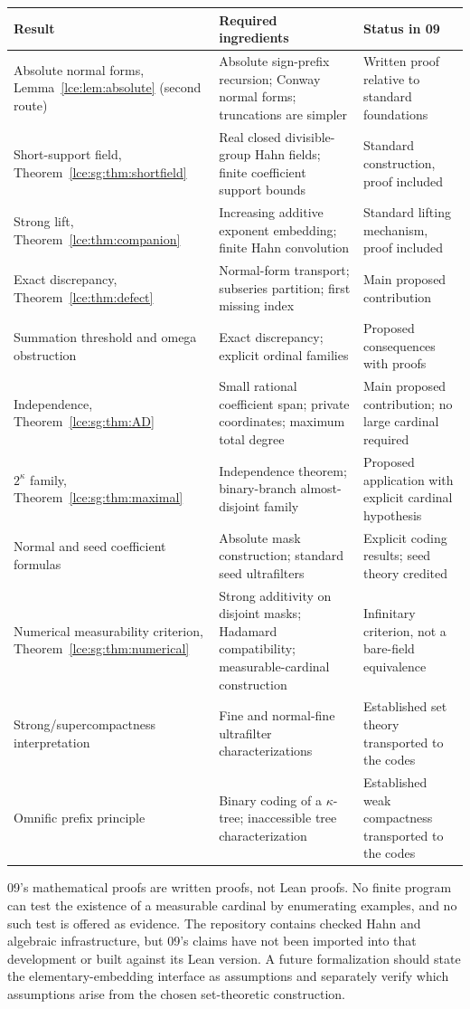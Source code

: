 \documentclass[11pt,letterpaper]{article}
\numberwithin{equation}{section}
\theoremstyle{definition}
\theoremstyle{remark}
\newcommand{\thref}[1]{Theorem~\ref{#1}}
\newcommand{\leref}[1]{Lemma~\ref{#1}}
\begin{document}
\begin{center}\small
\begin{longtable}{@{}P{0.29\textwidth}P{0.39\textwidth}P{0.24\textwidth}@{}}
\toprule
Result & Required ingredients & Status in 09\\
\midrule\endhead
Absolute normal forms, \leref{lce:lem:absolute} (second route) & Absolute
sign-prefix recursion; Conway normal forms; truncations are simpler &
Written proof relative to standard foundations\\[4pt]
Short-support field, \thref{lce:sg:thm:shortfield} & Real closed
divisible-group Hahn fields; finite coefficient support bounds & Standard
construction, proof included\\[4pt]
Strong lift, \thref{lce:thm:companion} & Increasing additive exponent
embedding; finite Hahn convolution & Standard lifting mechanism, proof
included\\[4pt]
Exact discrepancy, \thref{lce:thm:defect} & Normal-form transport; subseries
partition; first missing index & Main proposed contribution\\[4pt]
Summation threshold and omega obstruction & Exact discrepancy; explicit
ordinal families & Proposed consequences with proofs\\[4pt]
Independence, \thref{lce:sg:thm:AD} & Small rational coefficient span;
private coordinates; maximum total degree & Main proposed contribution; no
large cardinal required\\[4pt]
$2^\kappa$ family, \thref{lce:sg:thm:maximal} & Independence theorem;
binary-branch almost-disjoint family & Proposed application with explicit
cardinal hypothesis\\[4pt]
Normal and seed coefficient formulas & Absolute mask construction; standard
seed ultrafilters & Explicit coding results; seed theory credited\\[4pt]
Numerical measurability criterion, \thref{lce:sg:thm:numerical} & Strong
additivity on disjoint masks; Hadamard compatibility; measurable-cardinal
construction & Infinitary criterion, not a bare-field equivalence\\[4pt]
Strong/supercompactness interpretation & Fine and normal-fine ultrafilter
characterizations & Established set theory transported to the codes\\[4pt]
Omnific prefix principle & Binary coding of a $\kappa$-tree; inaccessible
tree characterization & Established weak compactness transported to the
codes\\
\bottomrule
\end{longtable}
\end{center}
09's mathematical proofs are written proofs, not Lean proofs. No finite
program can test the existence of a measurable cardinal by enumerating
examples, and no such test is offered as evidence. The repository contains
checked Hahn and algebraic infrastructure, but 09's claims have not been
imported into that development or built against its Lean version. A future
formalization should state the elementary-embedding interface as
assumptions and separately verify which assumptions arise from the chosen
set-theoretic construction.
\end{document}
